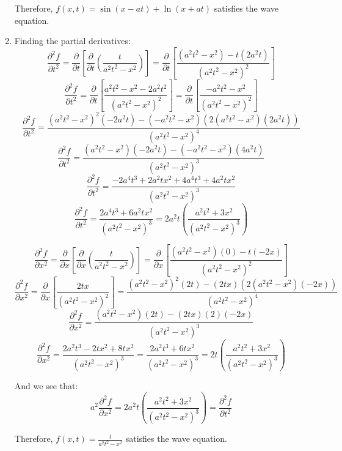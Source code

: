\begin{Answer}[ref = wave]
\begin{enumerate}
    Therefore, $f(x, t) = \sin{ \left( x - a t \right)} + \ln{ \left( x + a t 
    \right)}$ satisfies the wave equation. 

    \item Finding the partial derivatives:
    $$\frac{\partial^2 f}{\partial t^2} = \frac{\partial}{\partial t} \left[ 
    \frac{\partial}{\partial t} \left( \frac{t}{a^2 t^2 - x^2} \right) \right] 
    = \frac{\partial}{\partial t} \left[ \frac{\left(a^2 t^2 - x^2 \right) - t 
    \left(2 a^2 t \right)}{\left( a^2 t^2 - x^2 \right)^2} \right]$$
    $$\frac{\partial^2 f}{\partial t^2} = \frac{\partial}{\partial t} \left[ 
    \frac{a^2 t^2 - x^2 - 2 a^2 t^2}{\left( a^2 t^2 - x^2 \right)^2} \right] = 
    \frac{\partial}{\partial t} \left[ \frac{-a^2 t^2 - x^2}{\left( a^2 t^2 - 
    x^2 \right)^2} \right]$$
    $$\frac{\partial^2 f}{\partial t^2} = \frac{\left( a^2 t^2 - x^2 \right)^2 
    \left(-2 a^2t \right) - \left( -a^2 t^2 - x^2 \right) \left( 2 \left( a^2 
    t^2 - x^2 \right) \left( 2 a^2 t \right) \right)}{\left( a^2 t^2 - x^2 
    \right)^4}$$
    $$\frac{\partial^2 f}{\partial t^2} = \frac{\left( a^2 t^2 - x^2 \right) 
    \left( -2 a^2 t \right) - \left( -a^2 t^2 - x^2 \right) \left( 4 a^2 t 
    \right)}{\left( a^2 t^2 - x^2 \right)^3}$$
    $$\frac{\partial^2 f}{\partial t^2} = \frac{ -2 a^4 t^3 + 2 a^2 t x^2 + 4 
    a^4 t^3 + 4 a^2  t x^2}{\left( a^2 t^2 - x^2 \right)^3}$$
    $$\frac{\partial^2 f}{\partial t^2} = \frac{ 2 a^4 t^3 + 6 a^2 t x^2}{
    \left( a^2 t^2 - x^2 \right)^3} = 2 a^2 t \left( \frac{a^2 t^2 + 3 x^2}{
    \left( a^2 t^2 - x^2 \right)^3} \right)$$

    $$\frac{\partial^2 f}{\partial x^2} = \frac{\partial}{\partial x} \left[ 
    \frac{\partial}{\partial x} \left( \frac{t}{a^2 t^2 - x^2} \right) \right] 
    = \frac{\partial}{\partial x} \left[ \frac{\left( a^2 t^2 - x^2 \right) 
    \left( 0 \right) - t \left( -2 x \right)}{\left( a^2  t^2 - x^2 \right)^2} 
    \right]$$
    $$\frac{\partial^2 f}{\partial x^2} = \frac{\partial}{\partial x} \left[ 
    \frac{2 t x}{\left( a^2 t^2 - x^2 \right)^2} \right] = \frac{\left( a^2 
    t^2 - x^2 \right)^2 \left( 2 t \right) - \left( 2 t x \right) \left( 2 
    \left( a^2 t^2 - x^2 \right) \left( -2 x \right) \right)}{\left( a^2 t^2 - 
    x^2 \right)^4}$$
    $$\frac{\partial^2 f}{\partial x^2} = \frac{\left( a^2 t^2 - x^2 \right) 
    \left( 2 t \right) - \left( 2 t x \right) \left( 2 \right) \left( -2 x 
    \right)}{\left( a^2 t^2 - x^2 \right)^3}$$
    $$\frac{\partial^2 f}{\partial x^2} = \frac{2 a^2 t^3 - 2 t x^2 + 8 t x^2}{
    \left( a^2 t^2 - x^2 \right)^3} = \frac{2 a^2 t^3 + 6 t x^2}{\left( a^2 
    t^2 - x^2 \right)^3} = 2 t \left( \frac{a^2 t^2 + 3 x^2}{\left( a^2 t^2 - 
    x^2 \right)^3} \right)$$

    And we see that:
    $$a^2 \frac{\partial^2 f}{\partial x^2} = 2 a^2 t \left( \frac{a^2 t^2 + 3 
    x^2}{\left( a^2 t^2 - x^2 \right)^3} \right) = \frac{\partial^2 f}{
    \partial t^2}$$

    Therefore, $f(x, t) = \frac{t}{a^2t^2 - x^2}$ satisfies the wave equation. 
\end{enumerate}
\end{Answer}

